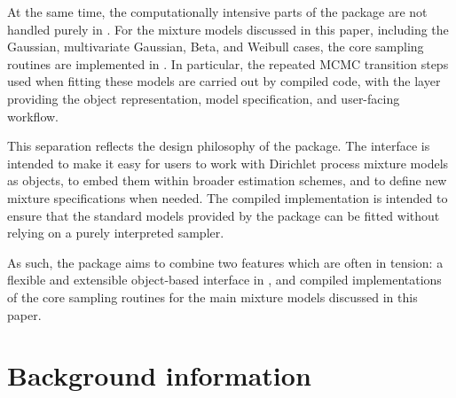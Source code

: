 \documentclass[nojss]{jss}
\begin{document}
At the same time, the computationally intensive parts of the package are not handled purely
in . For the mixture models discussed in this paper, including the Gaussian,
multivariate Gaussian, Beta, and Weibull cases, the core sampling routines are implemented
in . In particular, the repeated MCMC transition steps used when fitting these
models are carried out by compiled code, with the  layer providing the object
representation, model specification, and user-facing workflow.

This separation reflects the design philosophy of the package. The  interface is
intended to make it easy for users to work with Dirichlet process mixture models as objects,
to embed them within broader estimation schemes, and to define new mixture specifications
when needed. The compiled implementation is intended to ensure that the standard models
provided by the package can be fitted without relying on a purely interpreted sampler.

As such, the package aims to combine two features which are often in tension: a flexible and
extensible object-based interface in , and compiled implementations of the core
sampling routines for the main mixture models discussed in this paper.




\section{Background information}
\label{sec:background}
\end{document}
